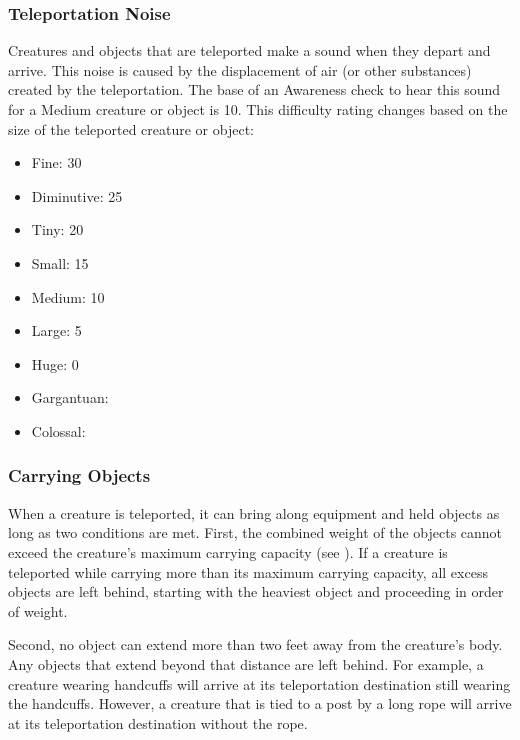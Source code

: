         \subsubsection{Teleportation Noise}\label{Teleportation Noise}
            Creatures and objects that are teleported make a sound when they depart and arrive.
            This noise is caused by the displacement of air (or other substances) created by the teleportation.
            The base  of an Awareness check to hear this sound for a Medium creature or object is 10.
            This difficulty rating changes based on the size of the teleported creature or object:

            \begin{itemize}
                \item Fine: 30
                \item Diminutive: 25
                \item Tiny: 20
                \item Small: 15
                \item Medium: 10
                \item Large: 5
                \item Huge: 0
                \item Gargantuan: 
                \item Colossal: 
            \end{itemize}

        \subsubsection{Carrying Objects}
            When a creature is teleported, it can bring along equipment and held objects as long as two conditions are met.
            First, the combined weight of the objects cannot exceed the creature's maximum carrying capacity (see ).
            If a creature is teleported while carrying more than its maximum carrying capacity, all excess objects are left behind, starting with the heaviest object and proceeding in order of weight.

            Second, no object can extend more than two feet away from the creature's body.
            Any objects that extend beyond that distance are left behind.
            For example, a creature wearing handcuffs will arrive at its teleportation destination still wearing the handcuffs.
            However, a creature that is tied to a post by a long rope will arrive at its teleportation destination without the rope.

